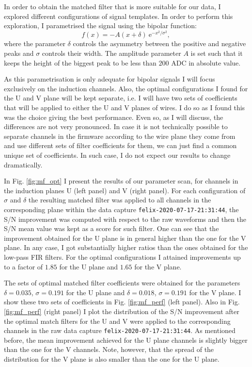 In order to obtain the matched filter that is more suitable for our data, I explored different configurations of signal templates. In order to perform this exploration, I parametrised the signal using the bipolar function:
\begin{equation}\label{2.4.13}
	f(x) = -A (x + \delta) \ \mathrm{e}^{-x^{2}/\sigma^{2}},
\end{equation}
where the parameter $\delta$ controls the asymmetry between the positive and negative peaks and $\sigma$ controls their width. The amplitude parameter $A$ is set such that it keeps the height of the biggest peak to be less than $200$ ADC in absolute value.

As this parametrisation is only adequate for bipolar signals I will focus exclusively on the induction channels. Also, the optimal configurations I found for the U and V plane will be kept separate, i.e. I will have two sets of coefficients that will be applied to either the U and V planes of wires. I do so as I found this was the choice giving the best performance. Even so, as I will discuss, the differences are not very pronounced. In case it is not technically possible to separate channels in the firmware according to the wire plane they come from and use different sets of filter coefficients for them, we can just find a common unique set of coefficients. In such case, I do not expect our results to change dramatically.

In Fig. \ref{fig:mf_opt} I present the results of our parameter scan, for channels in the induction planes U (left panel) and V (right panel). For each configuration of $\sigma$ and $\delta$ the resulting matched filter was applied to all channels in the corresponding plane within the data capture \texttt{felix-2020-07-17-21:31:44}, the S/N improvement was computed with respect to the raw waveforms and then the S/N mean value was kept as a score for such filter. One can see that the improvement obtained for the U plane is in general higher than the one for the V plane. In any case, I got substantially higher ratios than the ones obtained for the low-pass FIR filters. For the optimal configurations I attained improvements up to a factor of $1.85$ for the U plane and $1.65$ for the V plane.

The sets of optimal matched filter coefficients were obtained for the parameters $\delta = 0.035$, $\sigma = 0.191$ for the U plane and $\delta = 0.018$, $\sigma = 0.191$ for the V plane. I show these two sets of coefficients in Fig. \ref{fig:mf_perf} (left panel). Also in Fig. \ref{fig:mf_perf} (right panel) I plot the distribution of the S/N improvement after the optimal match filters for the U and V were applied to the corresponding channels in the raw data capture \texttt{felix-2020-07-17-21:31:44}. As mentioned before, the mean improvement achieved for the U plane channels is slightly bigger than the one for the V channels. Note, however, that the spread of the distribution for the V plane is also smaller than the one for the U plane.

